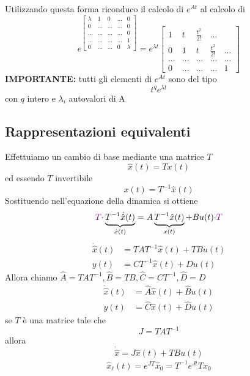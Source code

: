\documentclass{article}
\begin{document}
Utilizzando questa forma riconduco il calcolo di $e^{At}$ al calcolo di 
\[
    e^{
        \begin{bmatrix} 
            \lambda & 1 & 0 & ... & 0\\
            0 & ... & ... & ... &0\\
            ... & ... & ... & ... & 0\\
            ... & ... & ... & ... & 1\\
            0 & ... & ... & 0 & \lambda
        \end{bmatrix}
        }
        = e^{\lambda t}
        \begin{bmatrix}
            1 & t & \frac{t^2}{2!} & ... \\
            0 & 1 & t & \frac{t^2}{2!} & ... \\
            ... & ... & ... & ... & ...\\
            0 & ... & ... & ... & 1
        \end{bmatrix}
\]
\textbf{IMPORTANTE:} tutti gli elementi di $e^{At}$ sono del tipo
\[
    t^qe^{\lambda t}
\]
con $q$ intero e $\lambda_i$ autovalori di A


\subsection{Rappresentazioni equivalenti}
Effettuiamo un cambio di base mediante una matrice $T$
\[
    \hat x(t) = T x(t)
\]
ed essendo $T$ invertibile
\[
    x(t) = T^{-1} \hat x(t)
\]
Sostituendo nell'equazione della dinamica si ottiene
\begin{align*}
    {\color{violet} T \cdot} \underbrace{T^{-1} \dot{\hat x}(t)}_{\dot x(t)} &= A \underbrace{T^{-1} \hat x(t)}_{x(t)} + B u(t) {\color{violet} \cdot T } \\
\end{align*}
\begin{align*}
    \dot{\hat x}(t) &= TAT^{-1} \hat x(t) + T B u(t)\\
    y(t) &= CT^{-1} \hat x(t) + D u(t)
\end{align*}
Allora chiamo $\hat A = TAT^{-1}, \hat B=TB, \hat C = CT^{-1}, \hat D = D$
\begin{align*}
    \dot{\hat x}(t)  &= \hat A \hat x(t) + \hat B u(t)\\
    y(t) &= \hat C \hat x(t) + \hat D u(t)
\end{align*}
se $T$ è una matrice tale che
\[
    J = TAT^{-1}
\]
allora
\[
    \dot{\hat x} = J \hat x(t) + T B u(t)
\]
\begin{align*}
    \hat x_\ell (t) = e^{JT} \hat x_0 = T^{-1} e^{Jt}T x_0
\end{align*}
\end{document}
